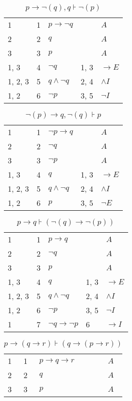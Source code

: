 \documentclass{article}
\begin{document}
\begin{table}[htbp]
\end{table}\begin{table}[htbp]\caption*{$p→ ¬(q),q ⊦ ¬(p)$}\centering\begin{tabular}{lllll}
{1} & 1 & $p→ ¬q$ & {} & $A$ \\
{2} & 2 & $q$ & {} & $A$ \\
{3} & 3 & $p$ & {} & $A$ \\
{1, 3} & 4 & $¬q$ & {1, 3} & $→E$ \\
{1, 2, 3} & 5 & $q∧ ¬q$ & {2, 4} & $∧I$ \\
{1, 2} & 6 & $¬p$ & {3, 5} & $¬I$ \\
\end{tabular}
\end{table}\begin{table}[htbp]\caption*{$¬(p)→q,¬(q) ⊦ p$}\centering\begin{tabular}{lllll}
{1} & 1 & $¬p→q$ & {} & $A$ \\
{2} & 2 & $¬q$ & {} & $A$ \\
{3} & 3 & $¬p$ & {} & $A$ \\
{1, 3} & 4 & $q$ & {1, 3} & $→E$ \\
{1, 2, 3} & 5 & $q∧ ¬q$ & {2, 4} & $∧I$ \\
{1, 2} & 6 & $p$ & {3, 5} & $¬E$ \\
\end{tabular}
\end{table}\begin{table}[htbp]\caption*{$p→q ⊦ (¬(q)→ ¬(p))$}\centering\begin{tabular}{lllll}
{1} & 1 & $p→q$ & {} & $A$ \\
{2} & 2 & $¬q$ & {} & $A$ \\
{3} & 3 & $p$ & {} & $A$ \\
{1, 3} & 4 & $q$ & {1, 3} & $→E$ \\
{1, 2, 3} & 5 & $q∧ ¬q$ & {2, 4} & $∧I$ \\
{1, 2} & 6 & $¬p$ & {3, 5} & $¬I$ \\
{1} & 7 & $¬q→ ¬p$ & {6} & $→I$ \\
\end{tabular}
\end{table}\begin{table}[htbp]\caption*{$p→(q→r) ⊦ (q→(p→r))$}\centering\begin{tabular}{lllll}
{1} & 1 & $p→q→r$ & {} & $A$ \\
{2} & 2 & $q$ & {} & $A$ \\
{3} & 3 & $p$ & {} & $A$ \\

\end{tabular}
\end{table}
\end{document}
